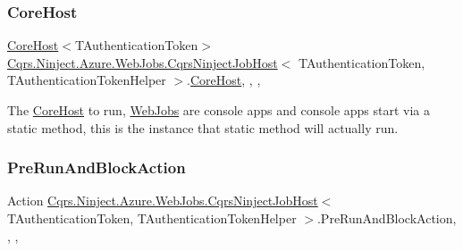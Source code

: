 \subsubsection{\texorpdfstring{Core\+Host}{CoreHost}}
{\footnotesize\ttfamily \hyperlink{classCqrs_1_1Hosts_1_1CoreHost}{Core\+Host}$<$T\+Authentication\+Token$>$ \hyperlink{classCqrs_1_1Ninject_1_1Azure_1_1WebJobs_1_1CqrsNinjectJobHost}{Cqrs.\+Ninject.\+Azure.\+Web\+Jobs.\+Cqrs\+Ninject\+Job\+Host}$<$ T\+Authentication\+Token, T\+Authentication\+Token\+Helper $>$.\hyperlink{classCqrs_1_1Hosts_1_1CoreHost}{Core\+Host}\hspace{0.3cm}{\ttfamily [static]}, {\ttfamily [get]}, {\ttfamily [set]}, {\ttfamily [protected]}}



The \hyperlink{classCqrs_1_1Ninject_1_1Azure_1_1WebJobs_1_1CqrsNinjectJobHost_a2c166839548b7c238a9462b46bd8e555_a2c166839548b7c238a9462b46bd8e555}{Core\+Host} to run, \hyperlink{namespaceCqrs_1_1Ninject_1_1Azure_1_1WebJobs}{Web\+Jobs} are console apps and console apps start via a static method, this is the instance that static method will actually run. 

\mbox{\label{classCqrs_1_1Ninject_1_1Azure_1_1WebJobs_1_1CqrsNinjectJobHost_a16eceaa51739d5baff6e4986ed822d8f_a16eceaa51739d5baff6e4986ed822d8f}} 
\subsubsection{\texorpdfstring{Pre\+Run\+And\+Block\+Action}{PreRunAndBlockAction}}
{\footnotesize\ttfamily Action \hyperlink{classCqrs_1_1Ninject_1_1Azure_1_1WebJobs_1_1CqrsNinjectJobHost}{Cqrs.\+Ninject.\+Azure.\+Web\+Jobs.\+Cqrs\+Ninject\+Job\+Host}$<$ T\+Authentication\+Token, T\+Authentication\+Token\+Helper $>$.Pre\+Run\+And\+Block\+Action\hspace{0.3cm}{\ttfamily [static]}, {\ttfamily [get]}, {\ttfamily [set]}, {\ttfamily [protected]}}

